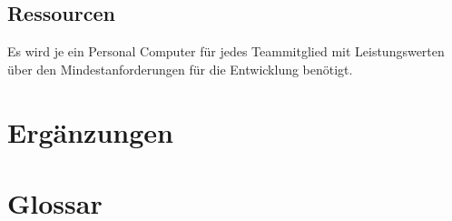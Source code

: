 \documentclass[10pt,a4paper]{article}
\begin{document}
\subsection{Ressourcen}
Es wird je ein Personal Computer für jedes Teammitglied mit Leistungswerten über den Mindestanforderungen für die Entwicklung benötigt.


\section{Ergänzungen}

\section{Glossar}
\end{document}

